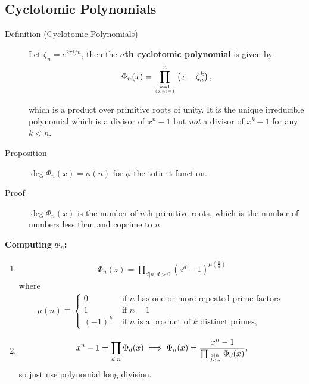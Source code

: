 \hypertarget{cyclotomic-polynomials}{%
\subsection{Cyclotomic Polynomials}\label{cyclotomic-polynomials}}

\begin{description}
\item[Definition (Cyclotomic Polynomials)]
Let \(\zeta_n = e^{2\pi i/n}\), then the \textbf{\(n\)th cyclotomic
polynomial} is given by
\begin{align*}
\Phi_{n}(x)=\prod_{k=1 \atop (j, n)=1}^{n}\left(x- \zeta_n^k\right)
,\end{align*}

which is a product over primitive roots of unity. It is the unique
irreducible polynomial which is a divisor of \(x^n - 1\) but \emph{not}
a divisor of \(x^k-1\) for any \(k<n\).
\item[Proposition]
\(\deg \Phi_n(x) = \phi(n)\) for \(\phi\) the totient function.
\item[Proof]
\(\deg \Phi_n(x)\) is the number of \(n\)th primitive roots, which is
the number of numbers less than and coprime to \(n\).
\end{description}

\textbf{Computing \(\Phi_n\):}

\begin{enumerate}
\def\labelenumi{\arabic{enumi}.}
\item

  \begin{align*}
  \Phi_{n}(z)=\prod_{d | n, d>0}\left(z^{d}-1\right)^{\mu\left(\frac{n}{d}\right)}
  \end{align*} where
  \begin{align*}
  \mu(n) \equiv\left\{\begin{array}{ll}{0} & {\text { if } n \text { has one or more repeated prime factors }} \\ {1} & {\text { if } n=1} \\ {(-1)^{k}} & {\text { if } n \text { is a product of } k \text { distinct primes, }}\end{array}\right.
  \end{align*}
\item

  \begin{align*}
  x^{n}-1=\prod_{d | n} \Phi_{d}(x) \implies \Phi_n(x) = \frac{x^n-1}{\prod_{d | n \atop d < n} \Phi_{d}(x)},
  \end{align*} so just use polynomial long division.
\end{enumerate}


